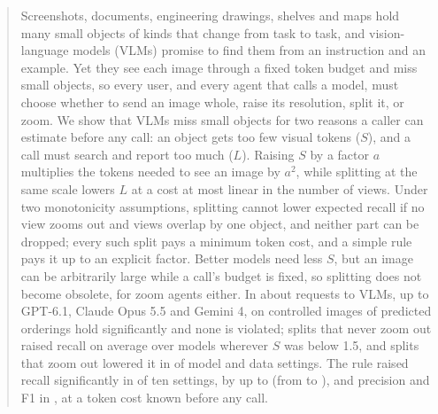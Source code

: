 \begin{abstract}
Screenshots, documents, engineering drawings, shelves and maps hold many small objects of kinds that change from task to task, and vision-language models (VLMs) promise to find them from an instruction and an example. Yet they see each image through a fixed token budget and miss small objects, so every user, and every agent that calls a model, must choose whether to send an image whole, raise its resolution, split it, or zoom. We show that VLMs miss small objects for two reasons a caller can estimate before any call: an object gets too few visual tokens ($S$), and a call must search and report too much ($L$). Raising $S$ by a factor $a$ multiplies the tokens needed to see an image by $a^2$, while splitting at the same scale lowers $L$ at a cost at most linear in the number of views. Under two monotonicity assumptions, splitting cannot lower expected recall if no view zooms out and views overlap by one object, and neither part can be dropped; every such split pays a minimum token cost, and a simple rule pays it up to an explicit factor. Better models need less $S$, but an image can be arbitrarily large while a call's budget is fixed, so splitting does not become obsolete, for zoom agents either. In about \CscaleCalls{} requests to \CscaleModels{} VLMs, up to GPT-6.1, Claude Opus 5.5 and Gemini 4, on controlled images \XasSup{} of \XasN{} predicted orderings hold significantly and none is violated; splits that never zoom out raised recall on average over models wherever $S$ was below 1.5, and splits that zoom out lowered it in \XtcOutNegPoint{} of \XtcOutN{} model and data settings. The rule raised recall significantly in \CtSigRec{} of ten settings, by up to \UcsMax{} (from \CtLsGemThreeEightRecW{} to \CtLsGemThreeEightRecR), and precision and F1 in \CtSigPrec, at a token cost known before any call.
\end{abstract}
